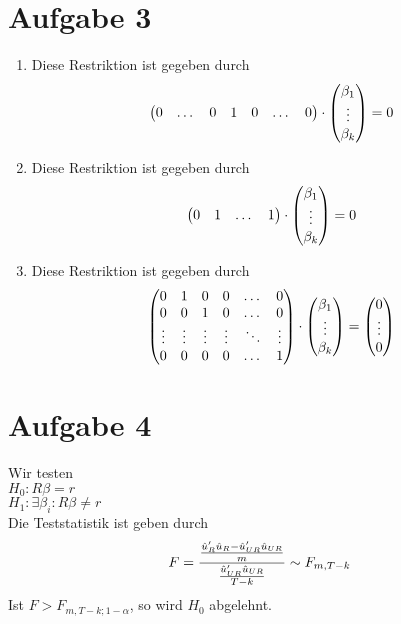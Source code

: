 \documentclass{article}
\begin{document}
	\section*{Aufgabe 3}
	\begin{enumerate}[label=(\alph*)]
		\item Diese Restriktion ist gegeben durch
		\begin{align}
			\begin{pmatrix}
				0 & \dots & 0 & 1 & 0 & \dots & 0
			\end{pmatrix}\cdot\begin{pmatrix}
				\beta_1 \\ \vdots \\ \beta_k
			\end{pmatrix} = 0 \notag
		\end{align}
		\item Diese Restriktion ist gegeben durch
		\begin{align}
		\begin{pmatrix}
			0 & 1 & \dots & 1
		\end{pmatrix}\cdot\begin{pmatrix}
			\beta_1 \\ \vdots \\ \beta_k
		\end{pmatrix} = 0 \notag
		\end{align}
		\item Diese Restriktion ist gegeben durch
		\begin{align}
		\begin{pmatrix}
			0 & 1 & 0 & 0 & \dots & 0 \\
			0 & 0 & 1 & 0 & \dots & 0 \\
			\vdots & \vdots & \vdots & \vdots & \ddots & \vdots \\
			0 & 0 & 0 & 0 & \dots & 1
		\end{pmatrix}\cdot\begin{pmatrix}
			\beta_1 \\ \vdots \\ \beta_k
		\end{pmatrix} = \begin{pmatrix}
			0 \\ \vdots \\ 0
		\end{pmatrix} \notag
		\end{align}
	\end{enumerate}

	\section*{Aufgabe 4}
	Wir testen \\
	$H_0: R\beta = r$ \\
	$H_1: \exists \beta_i : R\beta\neq r$ \\
	Die Teststatistik ist geben durch
	\begin{align}
		F = \frac{\frac{\hat{u}_R'\hat{u}_R - \hat{u}_{UR}'\hat{u}_{UR}}{m}}{\frac{\hat{u}'_{UR}\hat{u}_{UR}}{T-k}} \sim F_{m,T-k} \notag
	\end{align}
	Ist $F> F_{m,T-k;1-\alpha}$, so wird $H_0$ abgelehnt.
\end{document}
